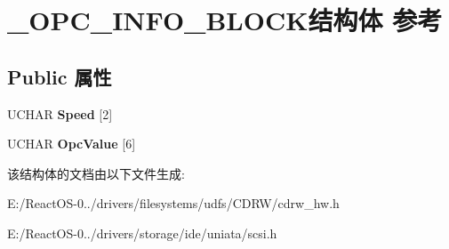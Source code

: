 \hypertarget{struct___o_p_c___i_n_f_o___b_l_o_c_k}{}\section{\+\_\+\+O\+P\+C\+\_\+\+I\+N\+F\+O\+\_\+\+B\+L\+O\+C\+K结构体 参考}
\label{struct___o_p_c___i_n_f_o___b_l_o_c_k}
\subsection*{Public 属性}
\begin{DoxyCompactItemize}
\item 
\mbox{\label{struct___o_p_c___i_n_f_o___b_l_o_c_k_abb52fa31e39a41e013465810f8f9aa17}} 
U\+C\+H\+AR {\bfseries Speed} \mbox{[}2\mbox{]}
\item 
\mbox{\label{struct___o_p_c___i_n_f_o___b_l_o_c_k_af83fff8e933ac0ce6bd0ca0869a13827}} 
U\+C\+H\+AR {\bfseries Opc\+Value} \mbox{[}6\mbox{]}
\end{DoxyCompactItemize}


该结构体的文档由以下文件生成\+:\begin{DoxyCompactItemize}
\item 
E\+:/\+React\+O\+S-\/0../drivers/filesystems/udfs/\+C\+D\+R\+W/cdrw\+\_\+hw.\+h\item 
E\+:/\+React\+O\+S-\/0../drivers/storage/ide/uniata/scsi.\+h\end{DoxyCompactItemize}
